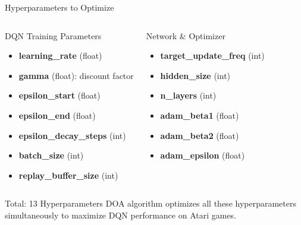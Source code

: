\documentclass[aspectratio=169,11pt]{beamer}
\begin{document}
	\begin{frame}{Hyperparameters to Optimize}
		\begin{columns}[T]
			\begin{block}{DQN Training Parameters}
				\footnotesize
				\begin{itemize}
					\item \textbf{learning\_rate} (float)
					\item \textbf{gamma} (float): discount factor
					\item \textbf{epsilon\_start} (float)
					\item \textbf{epsilon\_end} (float)
					\item \textbf{epsilon\_decay\_steps} (int)
					\item \textbf{batch\_size} (int)
					\item \textbf{replay\_buffer\_size} (int)
				\end{itemize}
			\end{block}
			
			\begin{block}{Network \& Optimizer}
				\footnotesize
				\begin{itemize}
					\item \textbf{target\_update\_freq} (int)
					\item \textbf{hidden\_size} (int)
					\item \textbf{n\_layers} (int)
					\item \textbf{adam\_beta1} (float)
					\item \textbf{adam\_beta2} (float)
					\item \textbf{adam\_epsilon} (float)
				\end{itemize}
			\end{block}
		\end{columns}
		
		\vspace{0.3cm}
		
		\begin{block}{Total: 13 Hyperparameters}
			\footnotesize
			DOA algorithm optimizes all these hyperparameters simultaneously to maximize DQN performance on Atari games.
		\end{block}
	\end{frame}
\end{document}
